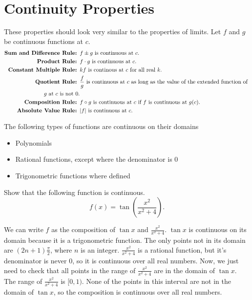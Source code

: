 \section{Continuity Properties}
These properties should look very similar to the properties of limits.
Let $f$ and $g$ be continuous functions at $c$.
\begin{align*}
	\textbf{Sum and Difference Rule: }& f \pm g \text{ is continuous at } c. \\
	\textbf{Product Rule: }& f \cdot g \text{ is continuous at } c. \\
	\textbf{Constant Multiple Rule: }& kf \text{ is continous at } c \text{ for all real } k. \\
	\textbf{Quotient Rule: }& \frac{f}{g} \text{ is continuous at } c \text{ as long as the value of the extended function of } \\
		g \text{ at } c \text{ is not } 0. \\
	\textbf{Composition Rule: }& f \circ g \text{ is continuous at } c \text{ if } f \text{ is continuous at } g(c). \\
	\textbf{Absolute Value Rule: }& \lvert f \rvert \text{ is continuous at } c.
\end{align*}

The following types of functions are continuous on their domains
\begin{itemize}
	\item Polynomials
	\item Rational functions, except where the denominator is 0
	\item Trigonometric functions where defined
\end{itemize}

\begin{example}
	Show that the following function is continuous.
	\begin{equation*}
		f(x) = \tan{\left(\frac{x^2}{x^2+4}\right)}.
	\end{equation*}
\end{example}
We can write $f$ as the composition of $\tan{x}$ and $\frac{x^2}{x^2+4}$.
$\tan{x}$ is continuous on its domain because it is a trigonometric function.
The only points not in its domain are $(2n+1)\frac{\pi}{2}$, where $n$ is an integer.
$\frac{x^2}{x^2+4}$ is a rational function, but it's denominator is never $0$, so it is continuous over all real numbers.
Now, we just need to check that all points in the range of $\frac{x^2}{x^2+4}$ are in the domain of $\tan{x}$.
The range of $\frac{x^2}{x^2+4}$ is $[0,1)$.
None of the points in this interval are not in the domain of $\tan{x}$, so the composition is continuous over all real numbers.